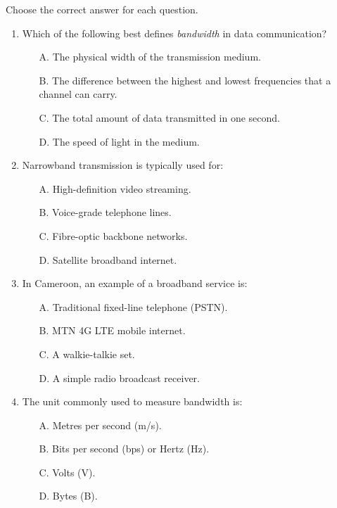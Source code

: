 \documentclass[11pt]{article}
\begin{document}
\begin{exercice}
Choose the correct answer for each question.

\begin{enumerate}
\item Which of the following best defines \emph{bandwidth} in data communication?
\begin{itemize}
\item[A.] The physical width of the transmission medium.
\item[B.] The difference between the highest and lowest frequencies that a channel can carry.
\item[C.] The total amount of data transmitted in one second.
\item[D.] The speed of light in the medium.
\end{itemize}

\item Narrowband transmission is typically used for:
\begin{itemize}
\item[A.] High-definition video streaming.
\item[B.] Voice-grade telephone lines.
\item[C.] Fibre-optic backbone networks.
\item[D.] Satellite broadband internet.
\end{itemize}

\item In Cameroon, an example of a broadband service is:
\begin{itemize}
\item[A.] Traditional fixed-line telephone (PSTN).
\item[B.] MTN 4G LTE mobile internet.
\item[C.] A walkie-talkie set.
\item[D.] A simple radio broadcast receiver.
\end{itemize}

\item The unit commonly used to measure bandwidth is:
\begin{itemize}
\item[A.] Metres per second (m/s).
\item[B.] Bits per second (bps) or Hertz (Hz).
\item[C.] Volts (V).
\item[D.] Bytes (B).
\end{itemize}
\end{enumerate}
\end{exercice}
\end{document}
